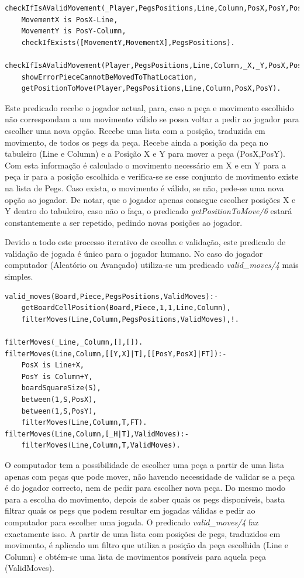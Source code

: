 \documentclass[paper=a4, fontsize=11pt]{scrartcl} %
\numberwithin{equation}{section} %
\numberwithin{figure}{section} %
\numberwithin{table}{section} %
\begin{document}
\begin{lstlisting}
checkIfIsAValidMovement(_Player,PegsPositions,Line,Column,PosX,PosY,PosX,PosY):-
	MovementX is PosX-Line,
	MovementY is PosY-Column,
	checkIfExists([MovementY,MovementX],PegsPositions).

checkIfIsAValidMovement(Player,PegsPositions,Line,Column,_X,_Y,PosX,PosY):-
	showErrorPieceCannotBeMovedToThatLocation,
	getPositionToMove(Player,PegsPositions,Line,Column,PosX,PosY).
\end{lstlisting}

Este predicado recebe o jogador actual, para, caso a peça e movimento escolhido não correspondam a um movimento válido se possa voltar a pedir ao jogador para escolher uma nova opção. Recebe uma lista com a posição, traduzida em movimento, de todos os pegs da peça. Recebe ainda a posição da peça no tabuleiro (Line e Column) e a Posição X e Y para mover a peça (PosX,PosY). Com esta informação é calculado o movimento necessário em X e em Y para a peça ir para a posição escolhida e verifica-se se esse conjunto de movimento existe na lista de Pegs. Caso exista, o movimento é válido, se não, pede-se uma nova opção ao jogador. De notar, que o jogador apenas consegue escolher posições X e Y dentro do tabuleiro, caso não o faça, o predicado \textit{getPositionToMove/6} estará constantemente a ser repetido, pedindo novas posições ao jogador.

Devido a todo este processo iterativo de escolha e validação, este predicado de validação de jogada é único para o jogador humano. No caso do jogador computador (Aleatório ou Avançado) utiliza-se um predicado \textit{valid\_moves/4} mais simples. 

\begin{lstlisting}
valid_moves(Board,Piece,PegsPositions,ValidMoves):-
	getBoardCellPosition(Board,Piece,1,1,Line,Column),
	filterMoves(Line,Column,PegsPositions,ValidMoves),!.
	
filterMoves(_Line,_Column,[],[]).
filterMoves(Line,Column,[[Y,X]|T],[[PosY,PosX]|FT]):-
	PosX is Line+X,
	PosY is Column+Y,
	boardSquareSize(S),
	between(1,S,PosX),
	between(1,S,PosY),
	filterMoves(Line,Column,T,FT).
filterMoves(Line,Column,[_H|T],ValidMoves):-
	filterMoves(Line,Column,T,ValidMoves).
\end{lstlisting}

O computador tem a possibilidade de escolher uma peça a partir de uma lista apenas com peças que pode mover, não havendo necessidade de validar se a peça é do jogador correcto, nem de pedir para escolher nova peça. Do mesmo modo para a escolha do movimento, depois de saber quais os pegs disponíveis, basta filtrar quais os pegs que podem resultar em jogadas válidas e pedir ao computador para escolher uma jogada. O predicado \textit{valid\_moves/4} faz exactamente isso. A partir de uma lista com posições de pegs, traduzidos em movimento, é aplicado um filtro que utiliza a posição da peça escolhida (Line e Column) e obtém-se uma lista de movimentos possíveis para aquela peça (ValidMoves).
\end{document}
